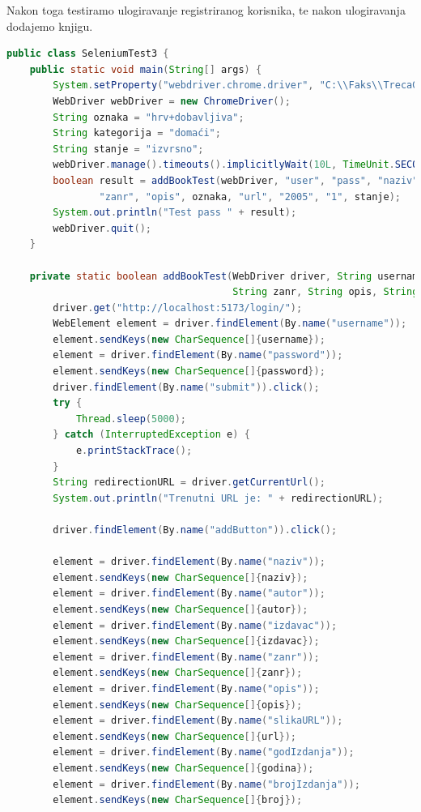 			Nakon toga testiramo ulogiravanje registriranog korisnika, te nakon ulogiravanja dodajemo knjigu.
                  \begin{lstlisting}[language=Java, label=l0st:java_example, basicstyle=\scriptsize, baselinestretch=0.9]
 public class SeleniumTest3 {
    public static void main(String[] args) {
        System.setProperty("webdriver.chrome.driver", "C:\\Faks\\TrecaGod\\PROGI\\Projekt\\chromedriver-win64\\chromedriver.exe");
        WebDriver webDriver = new ChromeDriver();
        String oznaka = "hrv+dobavljiva";
        String kategorija = "domaći";
        String stanje = "izvrsno";
        webDriver.manage().timeouts().implicitlyWait(10L, TimeUnit.SECONDS);
        boolean result = addBookTest(webDriver, "user", "pass", "naziv", "autor", "izdavac", kategorija,
                "zanr", "opis", oznaka, "url", "2005", "1", stanje);
        System.out.println("Test pass " + result);
        webDriver.quit();
    }

    private static boolean addBookTest(WebDriver driver, String username, String password, String naziv, String autor, String izdavac, String kategorija,
                                       String zanr, String opis, String oznaka, String url, String godina, String broj, String stanje){
        driver.get("http://localhost:5173/login/");
        WebElement element = driver.findElement(By.name("username"));
        element.sendKeys(new CharSequence[]{username});
        element = driver.findElement(By.name("password"));
        element.sendKeys(new CharSequence[]{password});
        driver.findElement(By.name("submit")).click();
        try {
            Thread.sleep(5000);
        } catch (InterruptedException e) {
            e.printStackTrace();
        }
        String redirectionURL = driver.getCurrentUrl();
        System.out.println("Trenutni URL je: " + redirectionURL);

        driver.findElement(By.name("addButton")).click();

        element = driver.findElement(By.name("naziv"));
        element.sendKeys(new CharSequence[]{naziv});
        element = driver.findElement(By.name("autor"));
        element.sendKeys(new CharSequence[]{autor});
        element = driver.findElement(By.name("izdavac"));
        element.sendKeys(new CharSequence[]{izdavac});
        element = driver.findElement(By.name("zanr"));
        element.sendKeys(new CharSequence[]{zanr});
        element = driver.findElement(By.name("opis"));
        element.sendKeys(new CharSequence[]{opis});
        element = driver.findElement(By.name("slikaURL"));
        element.sendKeys(new CharSequence[]{url});
        element = driver.findElement(By.name("godIzdanja"));
        element.sendKeys(new CharSequence[]{godina});
        element = driver.findElement(By.name("brojIzdanja"));
        element.sendKeys(new CharSequence[]{broj});


\end{lstlisting}
